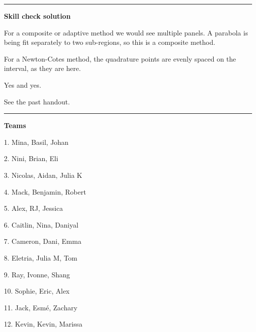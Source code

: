 \documentclass[12pt,letterpaper,noanswers]{exam}
\begin{document}
\vspace{0.2cm}
\hrule
\vspace{0.2cm}

\noindent \textbf{Skill check solution}
\begin{questions}

\item For a composite or adaptive method we would see multiple panels.  A parabola is being fit separately to two sub-regions, so this is a composite method.  

For a Newton-Cotes method, the quadrature points are evenly spaced on the interval, as they are here.

Yes and yes.

\item See the past handout.
\end{questions}
\vspace{0.2cm}
\hrule
\vspace{0.2cm}

\noindent \textbf{Teams}
\begin{multicols}{3}
1. Mina, Basil, Johan

2. Nini, Brian, Eli

3. Nicolas, Aidan, Julia K

4. Mack, Benjamin, Robert

5. Alex, RJ, Jessica

6. Caitlin, Nina, Daniyal

7. Cameron, Dani, Emma

8. Eletria, Julia M, Tom

9. Ray, Ivonne, Shang

10.  Sophie, Eric, Alex

11. Jack, Esmé, Zachary

12. Kevin, Kevin, Marissa

\end{multicols}
\end{document}
